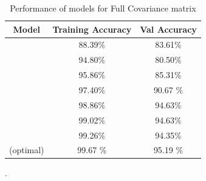 {
\begin{table}[!ht]
\centering
\begin{tabular}{ |c|c|c|  }
\hline
\rowcolor{lightgray} Model & Training Accuracy & Val Accuracy \\
\hline
[1,1,1,1,1] & 88.39$\%$  & 83.61$\%$ \\   
 \hline
[2,2,2,2,2] & 94.80$\%$  & 80.50$\%$ \\ 
\hline
[3,3,3,3,3] & 95.86$\%$  & 85.31$\%$ \\
\hline
[4,4,4,4,4] & 97.40$\%$  &  90.67 $\%$ \\
\hline
[5,5,5,5,5] & 98.86$\%$  & 94.63$\%$ \\
\hline
[6,6,6,6,6] & 99.02$\%$  & 94.63$\%$ \\
\hline
[7,7,7,7,7] & 99.26$\%$  & 94.35$\%$ \\
\hline
[8,8,8,8,8](optimal)  &  99.67 $\%$  & 95.19 $\%$ \\
\hline
\end{tabular}
\caption{Performance of models for Full Covariance matrix}.
\label{table:10}
\end{table}
}
\newpage







